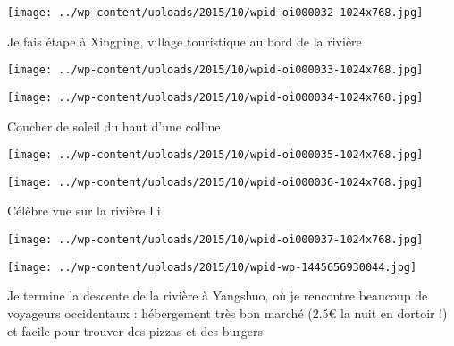  

\begin{center} \texttt{[image: ../wp-content/uploads/2015/10/wpid-oi000032-1024x768.jpg]} \end{center}

 

 Je fais étape à Xingping, village touristique au bord de la rivière 

 

\begin{center} \texttt{[image: ../wp-content/uploads/2015/10/wpid-oi000033-1024x768.jpg]} \end{center}

 

 

\begin{center} \texttt{[image: ../wp-content/uploads/2015/10/wpid-oi000034-1024x768.jpg]} \end{center}

 

 Coucher de soleil du haut d'une colline 

 

\begin{center} \texttt{[image: ../wp-content/uploads/2015/10/wpid-oi000035-1024x768.jpg]} \end{center}

 

 

\begin{center} \texttt{[image: ../wp-content/uploads/2015/10/wpid-oi000036-1024x768.jpg]} \end{center}

 

 Célèbre vue sur la rivière Li 

 

\begin{center} \texttt{[image: ../wp-content/uploads/2015/10/wpid-oi000037-1024x768.jpg]} \end{center}

 

 

\begin{center} \texttt{[image: ../wp-content/uploads/2015/10/wpid-wp-1445656930044.jpg]} \end{center}

 

 Je termine la descente de la rivière à Yangshuo, où je rencontre beaucoup de voyageurs occidentaux : hébergement très bon marché (2.5€ la nuit en dortoir !) et facile pour trouver des pizzas et des burgers 


